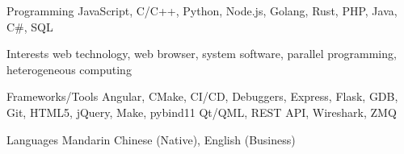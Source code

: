 
\begin{cvskills}
    \cvskill
    {Programming} %
    {JavaScript, C/C++, Python, Node.js, Golang, Rust, PHP, Java, C\#, SQL} %
    
    \cvskill
    {Interests} %
    {web technology, web browser, system software, parallel programming, heterogeneous computing} %

      \cvskill
        {Frameworks/Tools} %
        {Angular, CMake, CI/CD, Debuggers, Express, Flask, GDB, Git, HTML5, jQuery, Make, pybind11 \newline
        Qt/QML, REST API, Wireshark, ZMQ
        } %

      \cvskill
        {Languages} %
        {Mandarin Chinese (Native), English (Business)} %
    
\end{cvskills}
